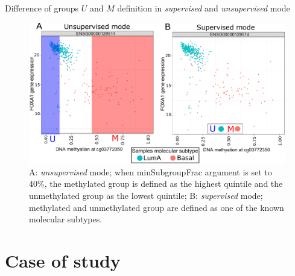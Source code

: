 \documentclass[slidestop,compress,11pt,xcolor=dvipsnames]{beamer}
\begin{document}
\begin{frame}{\normalsize{Difference of groups $U$ and $M$ definition in \textit{supervised} and \textit{unsupervised} mode}} 

 \vspace*{-0.3cm}
 \begin{figure}
 \centering
  \includegraphics[width=1.0\linewidth]{ELMER/mode.pdf}
  \scriptsize{\caption{ A:  \textit{unsupervised} mode; when minSubgroupFrac argument is set to 40\%, the methylated group is defined as the highest quintile and the unmethylated group as the lowest quintile; B:  \textit{supervised} mode; methylated and unmethylated group are defined as one of the known molecular subtypes.}}
 \end{figure}
\end{frame}

\section{Case of study}
\end{document}

